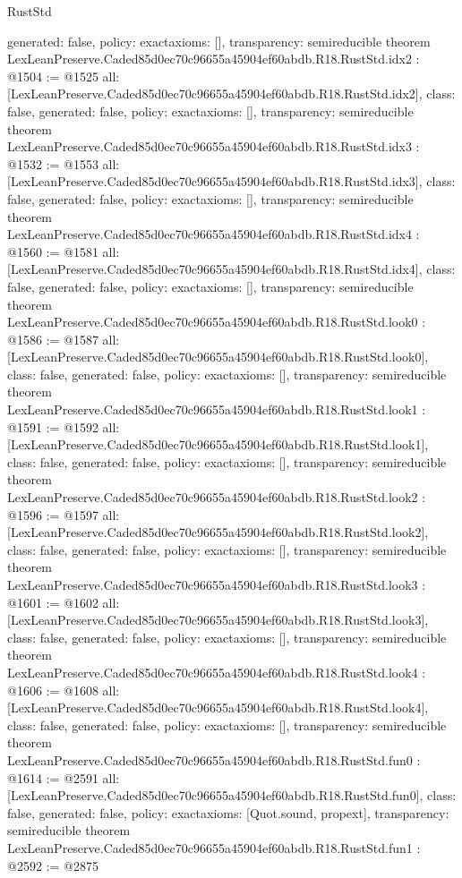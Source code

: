 \begin{lexlean}{RustStd}
\begin{coremodule}
{  generated: false,
  policy: exact{axioms: []},
  transparency: semireducible
}
theorem LexLeanPreserve.Caded85d0ec70c96655a45904ef60abdb.R18.RustStd.idx2 : @1504 := @1525 {
  all: [LexLeanPreserve.Caded85d0ec70c96655a45904ef60abdb.R18.RustStd.idx2],
  class: false,
  generated: false,
  policy: exact{axioms: []},
  transparency: semireducible
}
theorem LexLeanPreserve.Caded85d0ec70c96655a45904ef60abdb.R18.RustStd.idx3 : @1532 := @1553 {
  all: [LexLeanPreserve.Caded85d0ec70c96655a45904ef60abdb.R18.RustStd.idx3],
  class: false,
  generated: false,
  policy: exact{axioms: []},
  transparency: semireducible
}
theorem LexLeanPreserve.Caded85d0ec70c96655a45904ef60abdb.R18.RustStd.idx4 : @1560 := @1581 {
  all: [LexLeanPreserve.Caded85d0ec70c96655a45904ef60abdb.R18.RustStd.idx4],
  class: false,
  generated: false,
  policy: exact{axioms: []},
  transparency: semireducible
}
theorem LexLeanPreserve.Caded85d0ec70c96655a45904ef60abdb.R18.RustStd.look0 : @1586 := @1587 {
  all: [LexLeanPreserve.Caded85d0ec70c96655a45904ef60abdb.R18.RustStd.look0],
  class: false,
  generated: false,
  policy: exact{axioms: []},
  transparency: semireducible
}
theorem LexLeanPreserve.Caded85d0ec70c96655a45904ef60abdb.R18.RustStd.look1 : @1591 := @1592 {
  all: [LexLeanPreserve.Caded85d0ec70c96655a45904ef60abdb.R18.RustStd.look1],
  class: false,
  generated: false,
  policy: exact{axioms: []},
  transparency: semireducible
}
theorem LexLeanPreserve.Caded85d0ec70c96655a45904ef60abdb.R18.RustStd.look2 : @1596 := @1597 {
  all: [LexLeanPreserve.Caded85d0ec70c96655a45904ef60abdb.R18.RustStd.look2],
  class: false,
  generated: false,
  policy: exact{axioms: []},
  transparency: semireducible
}
theorem LexLeanPreserve.Caded85d0ec70c96655a45904ef60abdb.R18.RustStd.look3 : @1601 := @1602 {
  all: [LexLeanPreserve.Caded85d0ec70c96655a45904ef60abdb.R18.RustStd.look3],
  class: false,
  generated: false,
  policy: exact{axioms: []},
  transparency: semireducible
}
theorem LexLeanPreserve.Caded85d0ec70c96655a45904ef60abdb.R18.RustStd.look4 : @1606 := @1608 {
  all: [LexLeanPreserve.Caded85d0ec70c96655a45904ef60abdb.R18.RustStd.look4],
  class: false,
  generated: false,
  policy: exact{axioms: []},
  transparency: semireducible
}
theorem LexLeanPreserve.Caded85d0ec70c96655a45904ef60abdb.R18.RustStd.fun0 : @1614 := @2591 {
  all: [LexLeanPreserve.Caded85d0ec70c96655a45904ef60abdb.R18.RustStd.fun0],
  class: false,
  generated: false,
  policy: exact{axioms: [Quot.sound, propext]},
  transparency: semireducible
}
theorem LexLeanPreserve.Caded85d0ec70c96655a45904ef60abdb.R18.RustStd.fun1 : @2592 := @2875 {
}
\end{coremodule}
\end{lexlean}
